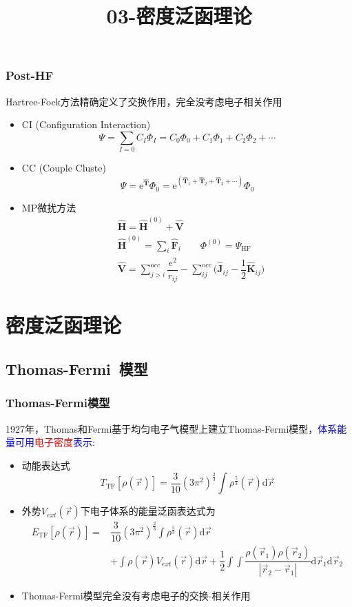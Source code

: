 {\frame
{
	\frametitle{\textrm{Post-HF}}
	\textrm{Hartree-Fock}方法精确定义了交换作用，完全没考虑电子相关作用
	\begin{itemize}
		\item \textrm{CI (Configuration Interaction)}
	$$\Psi=\sum_{I=0}C_I\Phi_I=C_0\Phi_0+C_1\Phi_1+C_2\Phi_2+\cdots$$
		\item \textrm{CC (Couple Cluste)}\\
			\begin{displaymath}
				\Psi=\mathrm{e}^{\hat{\mathbf T}}\Phi_0=\mathrm{e}^{(\hat{\mathbf T}_1+\hat{\mathbf T}_2+\hat{\mathbf T}_3+\cdots)}\Phi_0
			\end{displaymath}
		\item \textrm{MP}微扰方法
			\begin{displaymath}
				\begin{aligned}
					&\hat{\mathbf H}=\hat{\mathbf H}^{(0)}+\hat{\mathbf V} \\
					&\hat{\mathbf H}^{(0)}=\sum_i\hat{\mathbf F}_i \qquad \Phi^{(0)}=\Psi_{\mathrm{HF}}\\ 
					&\hat{\mathbf V}=\sum_{j>i}^{\mathrm occ}\dfrac{e^2}{r_{ij}}-\sum_{ij}^{\mathrm occ}\big(\hat{\mathbf J}_{ij}-\dfrac12\hat{\mathbf K}_{ij}\big)
				\end{aligned}
			\end{displaymath}
	\end{itemize}
}

\title{03-密度泛函理论}
\section{密度泛函理论}       %
\subsection{\rm{Thomas-Fermi~}模型}       %
\frame
{
	\frametitle{\textrm{Thomas-Fermi}模型} 
	\textrm{1927}年，\textrm{Thomas}和\textrm{Fermi}基于均匀电子气模型上建立\textrm{Thomas-Fermi}模型，\textcolor{blue}{体系能量可用}\textcolor{red}{电子密度}\textcolor{blue}{表示}:
	\begin{itemize}
		\item 动能表达式
			$$T_{\mathrm{TF}}[\rho(\vec r)]=\dfrac3{10}(3\pi^2)^{\frac23}\int\rho^{\frac53}(\vec r)\mathrm{d}\vec r$$
		\item 外势$V_{ext}(\vec r)$下电子体系的能量泛函表达式为
			\begin{displaymath}
				\begin{aligned}
					E_{\mathrm{TF}}[\rho(\vec r)]=&\dfrac3{10}(3\pi^2)^{\frac23}\int\rho^{\frac53}(\vec r)\mathrm{d}\vec r\\
					&+\int\rho(\vec r)V_{ext}(\vec r)\mathrm{d}\vec r+\dfrac12\int\int\dfrac{\rho(\vec r_1)\rho(\vec r_2)}{|\vec r_2-\vec r_1|}\mathrm{d}\vec r_1\mathrm{d}\vec r_2
				\end{aligned}
			\end{displaymath}
		\item \textrm{Thomas-Fermi}模型完全没有考虑电子的交换-相关作用
	\end{itemize}
}

}

